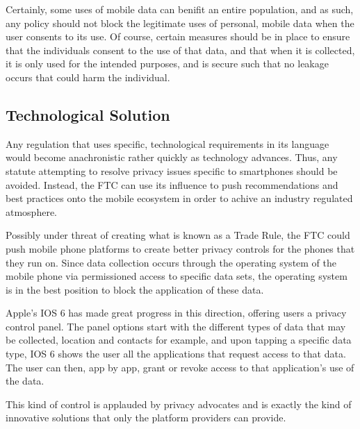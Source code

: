 Certainly, some uses of mobile data can benifit an entire population, and as such, any policy should not block the legitimate uses of personal, mobile data when the user consents to its use. Of course, certain measures should be in place to ensure that the individuals consent to the use of that data, and that when it is collected, it is only used for the intended purposes, and is secure such that no leakage occurs that could harm the individual. 



 	\subsection{Technological Solution}


Any regulation that uses specific, technological requirements in its language would become anachronistic rather quickly as technology advances. Thus, any statute attempting to resolve privacy issues specific to smartphones should be avoided. Instead, the FTC can use its influence to push recommendations and best practices onto the mobile ecosystem in order to achive an industry regulated atmosphere. 

Possibly under threat of creating what is known as a Trade Rule, the FTC could push mobile phone platforms to create better privacy controls for the phones that they run on. 
Since data collection occurs through the operating system of the mobile phone via permissioned access to specific data sets, the operating system is in the best position to block the application of these data. 

Apple's IOS 6 has made great progress in this direction, offering users a privacy control panel. The panel options start with the different types of data that may be collected, location and contacts for example, and upon tapping a specific data type, IOS 6 shows the user all the applications that request access to that data. The user can then, app by app, grant or revoke access to that application's use of the data.

This kind of control is applauded by privacy advocates and is exactly the kind of innovative solutions that only the platform providers can provide. 

